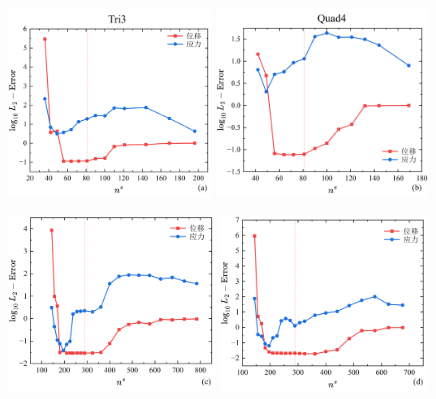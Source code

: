 \begin{figure}[H]
    \centering
    \begin{subcaptiongroup}
    \includegraphics[width=0.48\textwidth]{figures/shearlocking/T3-l2-ns8.png}
    \label{T3-l2-ns8}
    \includegraphics[width=0.50\textwidth]{figures/shearlocking/Q4-l2-ns8.png}
    \label{Q4-l2-ns8}
    \end{subcaptiongroup}
    \begin{subcaptiongroup}
    \includegraphics[width=0.49\textwidth]{figures/shearlocking/T3-l2-ns16.png}
    \label{T3-l2-ns16}
    \includegraphics[width=0.49\textwidth]{figures/shearlocking/Q4-l2-ns16.png}

\end{subcaptiongroup}
\end{figure}
